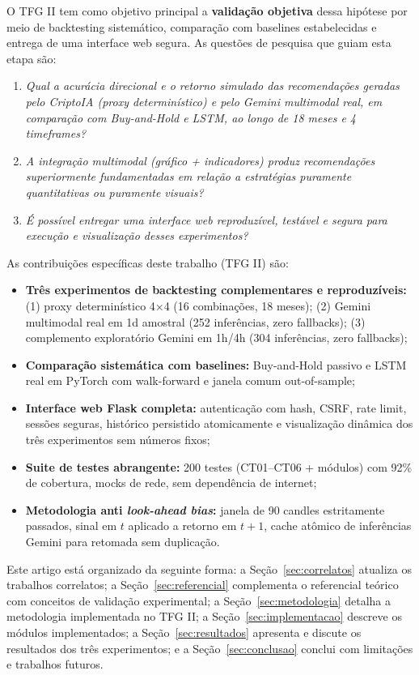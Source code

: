 \documentclass[conference]{IEEEtran}
\begin{document}
O TFG II tem como objetivo principal a \textbf{validação objetiva} dessa hipótese por meio de backtesting sistemático, comparação com baselines estabelecidas e entrega de uma interface web segura. As questões de pesquisa que guiam esta etapa são:

\begin{enumerate}
  \item \textit{Qual a acurácia direcional e o retorno simulado das recomendações geradas pelo CriptoIA (proxy determinístico) e pelo Gemini multimodal real, em comparação com Buy-and-Hold e LSTM, ao longo de 18 meses e 4 timeframes?}
  \item \textit{A integração multimodal (gráfico + indicadores) produz recomendações superiormente fundamentadas em relação a estratégias puramente quantitativas ou puramente visuais?}
  \item \textit{É possível entregar uma interface web reproduzível, testável e segura para execução e visualização desses experimentos?}
\end{enumerate}

As contribuições específicas deste trabalho (TFG II) são:

\begin{itemize}
  \item \textbf{Três experimentos de backtesting complementares e reproduzíveis:} (1) proxy determinístico 4×4 (16 combinações, 18 meses); (2) Gemini multimodal real em 1d amostral (252 inferências, zero fallbacks); (3) complemento exploratório Gemini em 1h/4h (304 inferências, zero fallbacks);
  \item \textbf{Comparação sistemática com baselines:} Buy-and-Hold passivo e LSTM real em PyTorch com walk-forward e janela comum out-of-sample;
  \item \textbf{Interface web Flask completa:} autenticação com hash, CSRF, rate limit, sessões seguras, histórico persistido atomicamente e visualização dinâmica dos três experimentos sem números fixos;
  \item \textbf{Suite de testes abrangente:} 200 testes (CT01–CT06 + módulos) com 92\% de cobertura, mocks de rede, sem dependência de internet;
  \item \textbf{Metodologia anti \textit{look-ahead bias}:} janela de 90 candles estritamente passados, sinal em $t$ aplicado a retorno em $t+1$, cache atômico de inferências Gemini para retomada sem duplicação.
\end{itemize}

Este artigo está organizado da seguinte forma: a Seção~\ref{sec:correlatos} atualiza os trabalhos correlatos; a Seção~\ref{sec:referencial} complementa o referencial teórico com conceitos de validação experimental; a Seção~\ref{sec:metodologia} detalha a metodologia implementada no TFG II; a Seção~\ref{sec:implementacao} descreve os módulos implementados; a Seção~\ref{sec:resultados} apresenta e discute os resultados dos três experimentos; e a Seção~\ref{sec:conclusao} conclui com limitações e trabalhos futuros.
\end{document}
